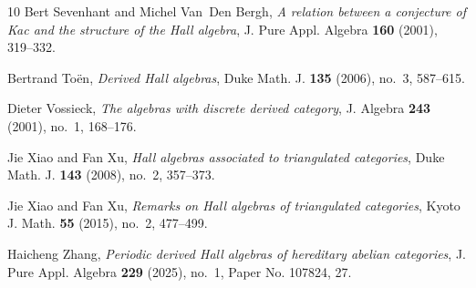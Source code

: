 \documentclass[reqno,12pt,a4paper]{amsart}
\theoremstyle{remark}
\theoremstyle{definition}
\numberwithin{equation}{section}
\begin{document}
\begin{thebibliography}{10}
Bert Sevenhant and Michel Van~Den Bergh, \emph{A relation between a conjecture
  of {K}ac and the structure of the {H}all algebra}, J. Pure Appl. Algebra
  \textbf{160} (2001), 319--332.

Bertrand To{\"e}n, \emph{Derived {H}all algebras}, Duke Math. J. \textbf{135}
  (2006), no.~3, 587--615.

Dieter Vossieck, \emph{The algebras with discrete derived category}, J. Algebra
  \textbf{243} (2001), no.~1, 168--176.

Jie Xiao and Fan Xu, \emph{Hall algebras associated to triangulated
  categories}, Duke Math. J. \textbf{143} (2008), no.~2, 357--373.

Jie Xiao and Fan Xu, \emph{Remarks on {H}all algebras of triangulated
  categories}, Kyoto J. Math. \textbf{55} (2015), no.~2, 477--499. 

Haicheng Zhang, \emph{Periodic derived {H}all algebras of hereditary abelian
  categories}, J. Pure Appl. Algebra \textbf{229} (2025), no.~1, Paper No.
  107824, 27.

\end{thebibliography}
\end{document}
